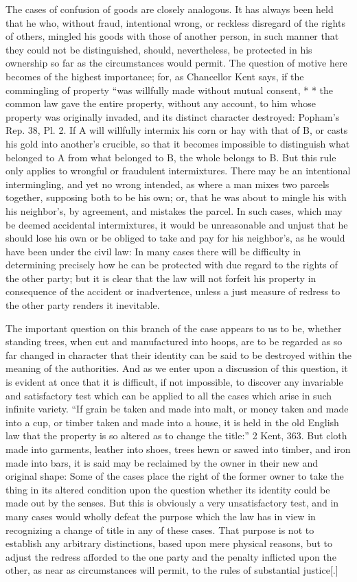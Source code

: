 The cases of confusion of goods are closely analogous. It has always been held
that he who, without fraud, intentional wrong, or reckless disregard of the
rights of others, mingled his goods with those of another person, in such
manner that they could not be distinguished, should, nevertheless, be protected
in his ownership so far as the circumstances would permit. The question of
motive here becomes of the highest importance; for, as Chancellor Kent says, if
the commingling of property ``was willfully made without mutual consent, * *
the common law gave the entire property, without any account, to him whose
property was originally invaded, and its distinct character destroyed: Popham's
Rep. 38, Pl. 2. If A will willfully intermix his corn or hay with that of B, or
casts his gold into another's crucible, so that it becomes impossible to
distinguish what belonged to A from what belonged to B, the whole belongs to B.
But this rule only applies to wrongful or fraudulent intermixtures. There may
be an intentional intermingling, and yet no wrong intended, as where a man
mixes two parcels together, supposing both to be his own; or, that he was about
to mingle his with his neighbor's, by agreement, and mistakes the parcel. In
such cases, which may be deemed accidental intermixtures, it would be
unreasonable and unjust that he should lose his own or be obliged to take and
pay for his neighbor's, as he would have been under the civil law: In many
cases there will be difficulty in determining precisely how he can be protected
with due regard to the rights of the other party; but it is clear that the law
will not forfeit his property in consequence of the accident or inadvertence,
unless a just measure of redress to the other party renders it inevitable. 

The important question on this branch of the case appears to us to be, whether
standing trees, when cut and manufactured into hoops, are to be regarded as so
far changed in character that their identity can be said to be destroyed within
the meaning of the authorities. And as we enter upon a discussion of this
question, it is evident at once that it is difficult, if not impossible, to
discover any invariable and satisfactory test which can be applied to all the
cases which arise in such infinite variety. ``If grain be taken and made into
malt, or money taken and made into a cup, or timber taken and made into a
house, it is held in the old English law that the property is so altered as to
change the title:'' 2 Kent, 363. But cloth made into garments, leather into
shoes, trees hewn or sawed into timber, and iron made into bars, it is said may
be reclaimed by the owner in their new and original shape: Some of the cases
place the right of the former owner to take the thing in its altered condition
upon the question whether its identity could be made out by the senses. But
this is obviously a very unsatisfactory test, and in many cases would wholly
defeat the purpose which the law has in view in recognizing a change of title
in any of these cases. That purpose is not to establish any arbitrary
distinctions, based upon mere physical reasons, but to adjust the redress
afforded to the one party and the penalty inflicted upon the other, as near as
circumstances will permit, to the rules of substantial justice[.]

